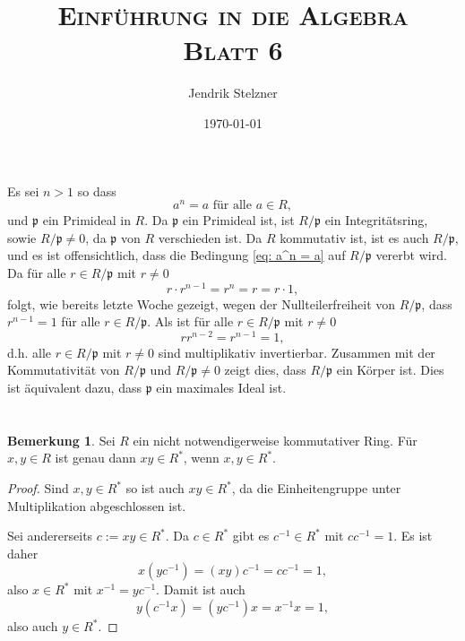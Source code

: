 \documentclass[a4paper,10pt]{article}
\title{\textsc{Einführung in die Algebra \\ \Large Blatt 6}}
\author{Jendrik Stelzner}
\date{\today}
\newcounter{satze}
\theoremstyle{definition}
\newtheorem{bem}[satze]{Bemerkung}
\newcommand{\mf}[1]{\mathfrak{#1}}
\begin{document}
\maketitle





\section{}
Es sei $n > 1$ so dass
\begin{equation}\label{eq: a^n = a}
 a^n = a \text{ für alle } a \in R,
\end{equation}
und $\mf{p}$ ein Primideal in $R$. Da $\mf{p}$ ein Primideal ist, ist $R/\mf{p}$ ein Integritätsring, sowie $R/\mf{p} \neq 0$, da $\mf{p}$ von $R$ verschieden ist. Da $R$ kommutativ ist, ist es auch $R/\mf{p}$, und es ist offensichtlich, dass die Bedingung \eqref{eq: a^n = a} auf $R/\mf{p}$ vererbt wird. Da für alle $r \in R/\mf{p}$ mit $r \neq 0$
\[
 r \cdot r^{n-1} = r^n = r = r \cdot 1,
\]
folgt, wie bereits letzte Woche gezeigt, wegen der Nullteilerfreiheit von $R/\mf{p}$, dass $r^{n-1} = 1$ für alle $r \in R/\mf{p}$. Als ist für alle $r \in R/\mf{p}$ mit $r \neq 0$
\[
 r r^{n-2} = r^{n-1} = 1,
\]
d.h. alle $r \in R/\mf{p}$ mit $r \neq 0$ sind multiplikativ invertierbar. Zusammen mit der Kommutativität von $R/\mf{p}$ und $R/\mf{p} \neq 0$ zeigt dies, dass $R/\mf{p}$ ein Körper ist. Dies ist äquivalent dazu, dass $\mf{p}$ ein maximales Ideal ist.





\section{}

\begin{bem}\label{bem: produkt in Einheitengruppe}
 Sei $R$ ein nicht notwendigerweise kommutativer Ring. Für $x,y \in R$ ist genau dann $xy \in R^*$, wenn $x,y \in R^*$.
\end{bem}
\begin{proof}
 Sind $x,y \in R^*$ so ist auch $xy \in R^*$, da die Einheitengruppe unter Multiplikation abgeschlossen ist.
 
 Sei andererseits $c := xy \in R^*$. Da $c \in R^*$ gibt es $c^{-1} \in R^*$ mit $c c^{-1} = 1$. Es ist daher
 \[
  x (yc^{-1}) = (xy) c^{-1} = c c^{-1} = 1,
 \]
 also $x \in R^*$ mit $x^{-1} = yc^{-1}$. Damit ist auch
 \[
  y(c^{-1} x) = (y c^{-1}) x =  x^{-1} x = 1,
 \]
 also auch $y \in R^*$.
\end{proof}
\end{document}
